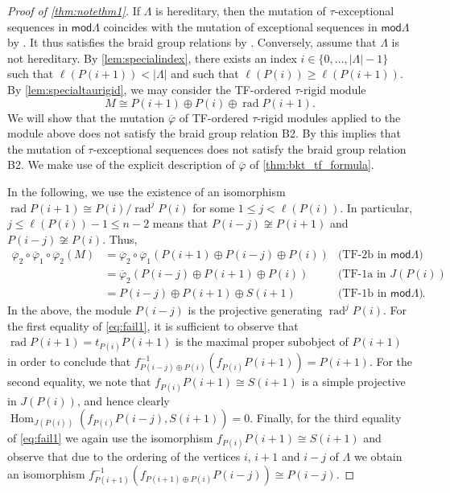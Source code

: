 \documentclass[11pt]{amsart}
\newcommand{\mods}{\mathsf{mod}}
\DeclareMathOperator{\Hom}{\mathrm{Hom}}
\DeclareMathOperator{\rad}{\mathrm{rad}}
\theoremstyle{definition}
\begin{document}
    \begin{proof}[Proof of \cref{thm:notethm1}]
        If $\Lambda$ is hereditary, then the mutation of $\tau$-exceptional sequences in $\mods \Lambda$ coincides with the mutation of exceptional sequences in $\mods \Lambda$ by \cite[Thm. 0.5]{BHM2024}. It thus satisfies the braid group relations by \cite{cbw92,ringel_exceptional}. Conversely, assume that $\Lambda$ is not hereditary. By \cref{lem:specialindex}, there exists an index $i \in \{0, \dots, |\Lambda|-1\}$ such that $\ell(P(i+1)) < |\Lambda|$ and such that $\ell(P(i)) \geq \ell(P(i+1))$. By \cref{lem:specialtaurigid}, we may consider the TF-ordered $\tau$-rigid module
        \[ M \cong P(i+1) \oplus P(i) \oplus \rad P(i+1).\]
        We will show that the mutation $\overline{\varphi}$ of TF-ordered $\tau$-rigid modules applied to the module above does not satisfy the braid group relation B2. By \cite[Def. 3.28, Prop. 3.32]{bkt} this implies that the mutation of $\tau$-exceptional sequences does not satisfy the braid group relation B2. We make use of the explicit description of $\overline{\varphi}$ of \cref{thm:bkt_tf_formula}.

        In the following, we use the existence of an isomorphism $\rad P(i+1) \cong P(i)/\rad^j P(i)$ for some $1 \leq j < \ell(P(i))$. In particular, $j \leq  \ell(P(i))-1 \leq n-2$ means that $P(i-j) \not \cong P(i+1)$ and $P(i-j) \not \cong P(i)$. Thus,
        \begin{equation}\label{eq:fail1}
        \begin{aligned}
            \overline{\varphi}_2 \circ \overline{\varphi}_1 \circ \overline{\varphi}_2(M) &= \overline{\varphi}_2 \circ \overline{\varphi}_1(P(i+1) \oplus P(i-j) \oplus P(i)) &\text{(TF-2b in $\mods \Lambda$)} \\
            &= \overline{\varphi}_2(P(i-j) \oplus P(i+1) \oplus P(i)) &\text{(TF-1a in $J(P(i))$} \\
            &= P(i-j) \oplus P(i+1) \oplus S(i+1) &\text{(TF-1b in $\mods \Lambda$)}.
        \end{aligned}
        \end{equation}
        In the above, the module $P(i-j)$ is the projective generating $\rad^j P(i)$. For the first equality of \cref{eq:fail1}, it is sufficient to observe that $\rad P(i+1) = t_{P(i)}P(i+1)$ is the maximal proper subobject of $P(i+1)$ in order to conclude that $f_{P(i-j) \oplus P(i)}^{-1}(f_{P(i)} P(i+1)) = P(i+1)$. For the second equality, we note that $f_{P(i)} P(i+1) \cong S(i+1)$ is a simple projective in $J(P(i))$, and hence clearly $\Hom_{J(P(i))}(f_{P(i)}P(i-j), S(i+1)) = 0$. Finally, for the third equality of \cref{eq:fail1} we again use the isomorphism $f_{P(i)}P(i+1) \cong S(i+1)$ and observe that due to the ordering of the vertices $i$, $i+1$ and $i-j$ of $\Lambda$ we obtain an isomorphism $f_{P(i+1)}^{-1}(f_{P(i+1)\oplus P(i)} P(i-j)) \cong P(i-j)$. 


\end{proof}
\end{document}
